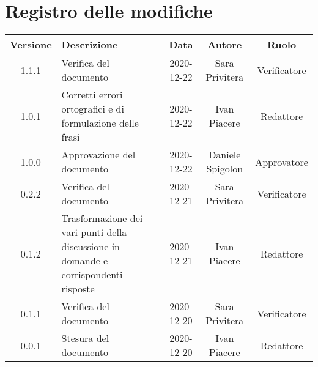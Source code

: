 \section*{Registro delle modifiche}

\begin{center}
	\begin{longtable}{|c|p{5cm}|c|c|c|}
	\hline
	\rowcolor{lighter-grayer}
	\textbf{Versione} & \textbf{Descrizione} & \textbf{Data} & \textbf{Autore} & \textbf{Ruolo} \\
	\hline
	\endfirsthead

	
	1.1.1 & Verifica del documento & 2020-12-22 & Sara Privitera & Verificatore \\
	\hline
	1.0.1 & Corretti errori ortografici e di formulazione delle frasi & 2020-12-22 & Ivan Piacere & Redattore \\
	\hline
	1.0.0 & Approvazione del documento & 2020-12-22 & Daniele Spigolon & Approvatore \\
	\hline
	0.2.2 & Verifica del documento & 2020-12-21 & Sara Privitera & Verificatore \\
	\hline
	0.1.2 & Trasformazione dei vari punti della discussione in domande e corrispondenti risposte & 2020-12-21 & Ivan Piacere & Redattore \\
	\hline
	0.1.1 & Verifica del documento & 2020-12-20 & Sara Privitera & Verificatore \\
	\hline
	0.0.1 & Stesura del documento & 2020-12-20 & Ivan Piacere & Redattore \\
	\hline
	\end{longtable}
\end{center}
